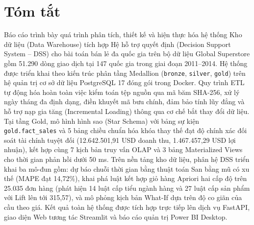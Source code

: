 \documentclass[a4paper, 12pt]{article}
\begin{document}
\section*{Tóm tắt}
Báo cáo trình bày quá trình phân tích, thiết kế và hiện thực hóa hệ thống Kho dữ liệu (Data Warehouse) tích hợp Hệ hỗ trợ quyết định (Decision Support System -- DSS) cho bài toán bán lẻ đa quốc gia trên bộ dữ liệu Global Superstore gồm 51.290 dòng giao dịch tại 147 quốc gia trong giai đoạn 2011--2014. Hệ thống được triển khai theo kiến trúc phân tầng Medallion (\texttt{bronze}, \texttt{silver}, \texttt{gold}) trên hệ quản trị cơ sở dữ liệu PostgreSQL 17 đóng gói trong Docker. Quy trình ETL tự động hóa hoàn toàn việc kiểm toán tệp nguồn qua mã băm SHA-256, xử lý ngày tháng đa định dạng, điền khuyết mã bưu chính, đảm bảo tính lũy đẳng và hỗ trợ nạp gia tăng (Incremental Loading) thông qua cơ chế bắt thay đổi dữ liệu. Tại tầng Gold, mô hình hình sao (Star Schema) với bảng sự kiện \texttt{gold.fact\_sales} và 5 bảng chiều chuẩn hóa khóa thay thế đạt độ chính xác đối soát tài chính tuyệt đối (12.642.501,91 USD doanh thu, 1.467.457,29 USD lợi nhuận), kết hợp cùng 7 kịch bản truy vấn OLAP và 3 bảng Materialized Views cho thời gian phản hồi dưới 50 ms. Trên nền tảng kho dữ liệu, phân hệ DSS triển khai ba mô-đun gồm: dự báo chuỗi thời gian bằng thuật toán San bằng mũ có xu thế (MAPE đạt 14,72\%), khai phá luật kết hợp giỏ hàng Apriori hai cấp độ trên 25.035 đơn hàng (phát hiện 14 luật cấp tiểu ngành hàng và 27 luật cấp sản phẩm với Lift lên tới 315,57), và mô phỏng kịch bản What-If dựa trên độ co giãn của cầu theo giá. Kết quả toàn hệ thống được tích hợp trực tiếp lên dịch vụ FastAPI, giao diện Web tương tác Streamlit và báo cáo quản trị Power BI Desktop.

\newpage
\tableofcontents
\newpage
\renewcommand{\listfigurename}{Danh mục hình ảnh}
\listoffigures
\addcontentsline{toc}{section}{\listfigurename}
\newpage

\newpage

\newpage

\newpage

\newpage

\newpage

\newpage
\end{document}
